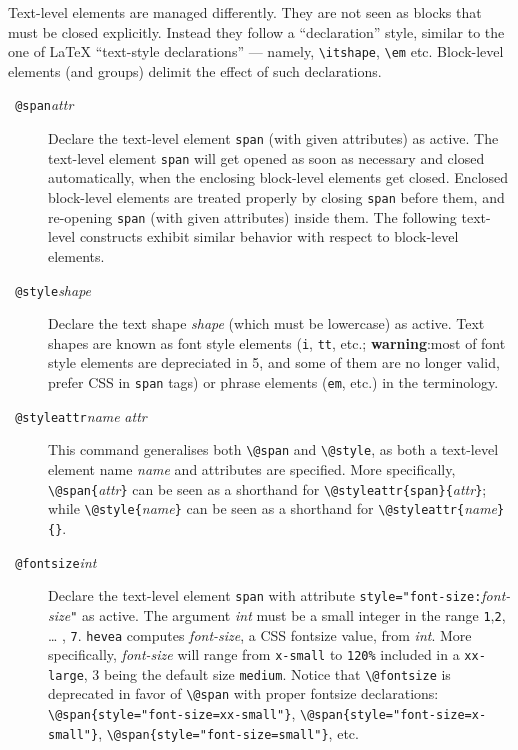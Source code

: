 Text-level elements are managed differently. They are not seen
as blocks that must be closed explicitly.
Instead they follow a ``declaration'' style, similar
to the one of \LaTeX{} ``text-style declarations'' --- namely,
\verb+\itshape+, \verb+\em+ etc.
Block-level elements (and \html{} groups)
delimit the effect of such declarations.
\begin{description}
\item[{{\tt{} @span}{\it attr}{\tt{}}}]
Declare the text-level element \verb+span+ (with given attributes)
as active.
The text-level element \verb+span+ will get opened as soon as
necessary and closed automatically, when the
enclosing block-level elements get closed.
Enclosed block-level elements are treated properly by closing \verb+span+
before them, and re-opening \verb+span+ (with given attributes)
inside them.
The following text-level constructs exhibit similar behavior with respect
to block-level elements.

\item[{\tt{} @style}{\it shape}{\tt{}}] Declare the
text shape \textit{shape} (which must be lowercase) as active. Text
shapes are known as font style elements (\verb+i+, \verb+tt+, etc.;
\textbf{warning}:most of font style elements are depreciated in \html{}5,
and some of them are no longer valid, prefer CSS in \verb+span+ tags)
or phrase elements (\verb+em+, etc.) in the \html{} terminology.


\item[{\tt{} @styleattr}{\it name}{\tt{}}{\it
attr}{\tt{}}]
This command generalises both \verb+\@span+ and \verb+\@style+,
as both a text-level element name \textit{name} and attributes are specified.
More specifically, 
\verb+\@span{+\textit{attr}\verb+}+ can be seen as a shorthand for
\verb+\@styleattr{span}{+\textit{attr}\verb+}+;
while
\verb+\@style{+\textit{name}\verb+}+ can be seen as
a shorthand for
\verb+\@styleattr{+\textit{name}\verb+}{}+.

\item[{\tt{} @fontsize}{\it int}{\tt{}}] Declare
the text-level element \verb+span+ with attribute
\verb+style="font-size:+\textit{font-size}\verb+"+ as active.
The argument
\textit{int} must be a small integer in the range
\texttt{1},\texttt{2}, \ldots{} , \texttt{7}.
\texttt{hevea} computes \textit{font-size}, a CSS fontsize value,
 from \textit{int}.
More specifically, \textit{font-size} will
range from \verb+x-small+ to \verb+120%+ included in
a \verb+xx-large+, 3 being the  default size \verb+medium+.
Notice that \verb+\@fontsize+ is deprecated in favor of
\verb+\@span+ with proper fontsize declarations:
\verb+\@span{style="font-size=xx-small"}+,
\verb+\@span{style="font-size=x-small"}+,
\verb+\@span{style="font-size=small"}+,
etc.



\end{description}
